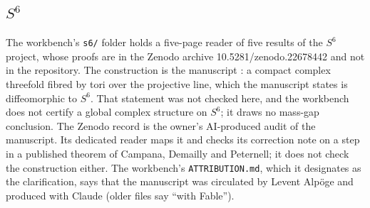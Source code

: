 \subsection{\texorpdfstring{$S^6$}{S6}}

The workbench's \texttt{s6/} folder holds a five-page reader of five results of the $S^6$ project, whose proofs are in the Zenodo archive 10.5281/zenodo.22678442 and not in the repository. The construction is the manuscript \cite{AlpogeS6}: a compact complex threefold fibred by tori over the projective line, which the manuscript states is diffeomorphic to $S^6$. That statement was not checked here, and the workbench does not certify a global complex structure on $S^6$; it draws no mass-gap conclusion. The Zenodo record is the owner's AI-produced audit of the manuscript. Its dedicated reader \cite{S6Reader} maps it and checks its correction note on a step in a published theorem of Campana, Demailly and Peternell; it does not check the construction either. The workbench's \texttt{ATTRIBUTION.md}, which it designates as the clarification, says that the manuscript was circulated by Levent Alpöge and produced with Claude (older files say ``with Fable'').

